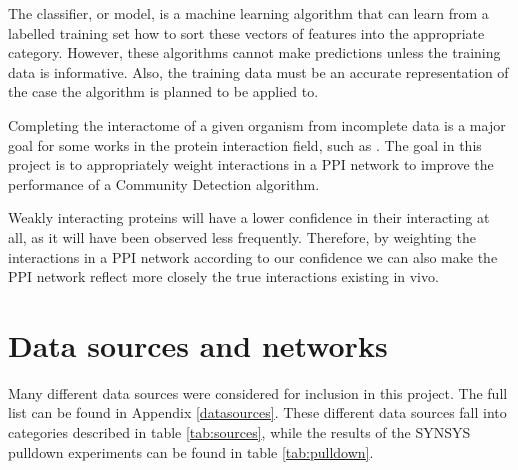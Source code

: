 The classifier, or model, is a machine learning algorithm that can learn from a labelled training set how to sort these vectors of features into the appropriate category. %
However, these algorithms cannot make predictions unless the training data is informative.   
Also, the training data must be an accurate representation of the case the algorithm is planned to be applied to. %

Completing the interactome of a given organism from incomplete data is a major goal for some works in the protein interaction field, such as \textcite{rodgers-melnick_predicting_2013}.
The goal in this project is to appropriately weight interactions in a \ac{PPI} network to improve the performance of a Community Detection algorithm.

Weakly interacting proteins will have a lower confidence in their interacting at all, as it will have been observed less frequently.
Therefore, by weighting the interactions in a \ac{PPI} network according to our confidence we can also make the \ac{PPI} network reflect more closely the true interactions existing in vivo. %

\section{Data sources and networks}
\label{back:sources}

Many different data sources were considered for inclusion in this project. %
The full list can be found in Appendix \ref{datasources}.
These different data sources fall into categories described in table \ref{tab:sources}, while the results of the SYNSYS pulldown experiments can be found in table \ref{tab:pulldown}.


